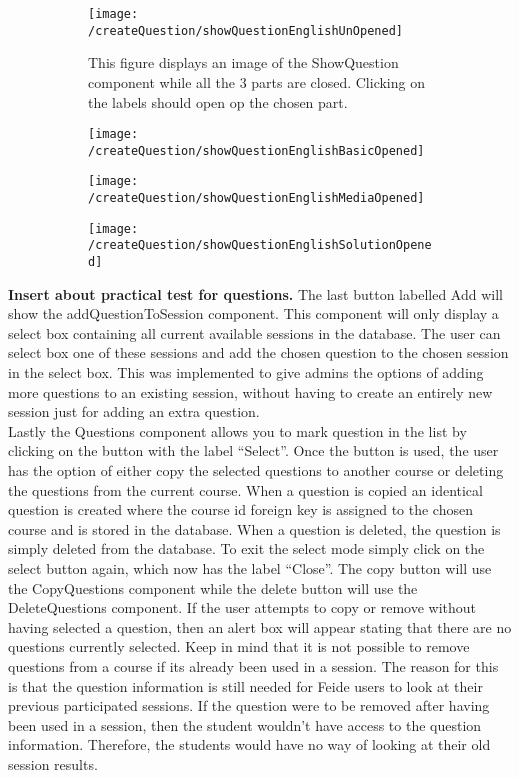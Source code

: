 \begin{figure}[H]
	\centering
	\begin{subfigure}{0.80\linewidth}
		\texttt{[image: /createQuestion/showQuestionEnglishUnOpened]}
		\caption{This figure displays an image of the ShowQuestion component while all the 3 parts are closed. Clicking on the labels should open op the chosen part.}
		\label{fig:showQuestionUnOpened}
	\end{subfigure}
	\begin{subfigure}{0.32\linewidth}
		\texttt{[image: /createQuestion/showQuestionEnglishBasicOpened]}
		\caption{}
		\label{fig:showQuestionBasicOpened}
	\end{subfigure}
	\begin{subfigure}{0.32\linewidth}
		\texttt{[image: /createQuestion/showQuestionEnglishMediaOpened]}
		\caption{}
		\label{fig:showQuestionMediaOpened}
	\end{subfigure}
	\begin{subfigure}{0.32\linewidth}
		\texttt{[image: /createQuestion/showQuestionEnglishSolutionOpened]}
		\caption{}
		\label{fig:showQuestionSolutionOpened}
	\end{subfigure}
\end{figure}
\noindent
\textbf{Insert about practical test for questions.}
The last button labelled Add will show the addQuestionToSession component. This component will only display a select box containing all current available sessions in the database. The user can select box one of these sessions and add the chosen question to the chosen session in the select box. This was implemented to give admins the options of adding more questions to an existing session, without having to create an entirely new session just for adding an extra question.
\\[11pt]
Lastly the Questions component allows you to mark question in the list by clicking on the button with the label “Select”. Once the button is used, the user has the option of either copy the selected questions to another course or deleting the questions from the current course. When a question is copied an identical question is created where the course id foreign key is assigned to the chosen course and is stored in the database. When a question is deleted, the question is simply deleted from the database. To exit the select mode simply click on the select button again, which now has the label “Close”. The copy button will use the CopyQuestions component while the delete button will use the DeleteQuestions component. If the user attempts to copy or remove without having selected a question, then an alert box will appear stating that there are no questions currently selected. Keep in mind that it is not possible to remove questions from a course if its already been used in a session. The reason for this is that the question information is still needed for Feide users to look at their previous participated sessions. If the question were to be removed after having been used in a session, then the student wouldn't have access to the question information. Therefore, the students would have no way of looking at their old session results. 
